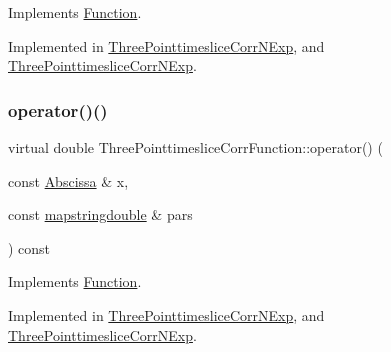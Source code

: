 Implements \mbox{\hyperlink{classFunction_ac6dc83996d6f002141a0a0f66f2c6496}{Function}}.



Implemented in \mbox{\hyperlink{classThreePointtimesliceCorrNExp_aa137e909c6466275f495aac9f2d24178}{Three\+Pointtimeslice\+Corr\+N\+Exp}}, and \mbox{\hyperlink{classThreePointtimesliceCorrNExp_aa137e909c6466275f495aac9f2d24178}{Three\+Pointtimeslice\+Corr\+N\+Exp}}.

\mbox{\label{classThreePointtimesliceCorrFunction_af4198f5c0d9085c5dcc8d79447d54348}} 
\subsubsection{\texorpdfstring{operator()()}{operator()()}\hspace{0.1cm}{\footnotesize\ttfamily [1/4]}}
{\footnotesize\ttfamily virtual double Three\+Pointtimeslice\+Corr\+Function\+::operator() (\begin{DoxyParamCaption}\item[{const \mbox{\hyperlink{classAbscissa}{Abscissa}} \&}]{x,  }\item[{const \mbox{\hyperlink{lib_2fitting__lib_2includes_8h_a647b481c557c7966517f753340a81d13}{mapstringdouble}} \&}]{pars }\end{DoxyParamCaption}) const\hspace{0.3cm}{\ttfamily [pure virtual]}}



Implements \mbox{\hyperlink{classFunction_a8cd7f815d5f883cc523341c53ba811d0}{Function}}.



Implemented in \mbox{\hyperlink{classThreePointtimesliceCorrNExp_a4d3143ae44c362e4dae6221ace8f1c02}{Three\+Pointtimeslice\+Corr\+N\+Exp}}, and \mbox{\hyperlink{classThreePointtimesliceCorrNExp_a4d3143ae44c362e4dae6221ace8f1c02}{Three\+Pointtimeslice\+Corr\+N\+Exp}}.

\mbox{\label{classThreePointtimesliceCorrFunction_a9d86382fdb47e87d53aea1878abd1da0}} 
